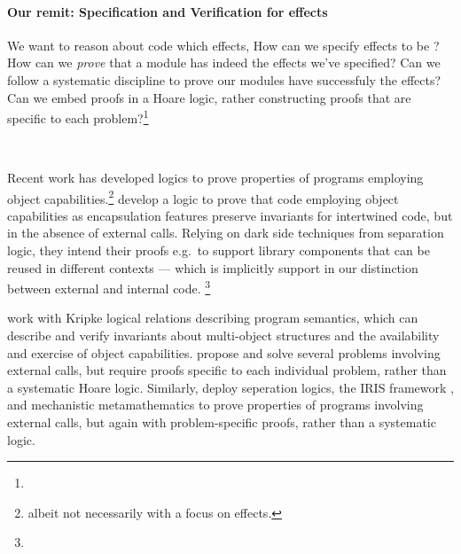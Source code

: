 \paragraph{Our remit: Specification and Verification  for  \tamed effects}  
We want to reason about  code which \tames effects,   
How can we specify effects to be \tamed? How can we \emph{prove}
that %
a module has indeed \tamed the effects we've specified?
Can we follow a systematic discipline to
prove our modules have successfuly \tamed the effects?
Can we embed proofs in a Hoare logic,
rather constructing proofs that are 
specific to each problem?\footnote{
}


~

Recent work has developed logics to prove properties of programs employing object capabilities.\footnote{albeit not necessarily with a focus on \tamed effects.}
\citet{ddd} develop a logic to prove that   code employing object
capabilities as encapsulation features preserve invariants for
intertwined code, but in the absence of external calls. Relying on
dark side techniques from separation logic, they intend their proofs
e.g.\ to support library components that can be reused in different
contexts --- which is implicitly support in our distinction between
external and internal code.
 \footnote{}
 
 \citet{dd} work with Kripke logical relations describing
program semantics, which can describe and verify invariants
about multi-object structures and the availability and exercise of
object capabilities.  \citeauthor{dd} propose and solve several
problems involving external calls, 
but require proofs specific to each individual problem,
rather than a systematic Hoare logic. Similarly,
\citet{vmsl-pldi2023} deploy seperation logics, the IRIS framework
\cite{iris-jfp2018}, and mechanistic metamathematics
to prove properties of programs involving external calls, but again
with problem-specific proofs, rather than a systematic logic.



